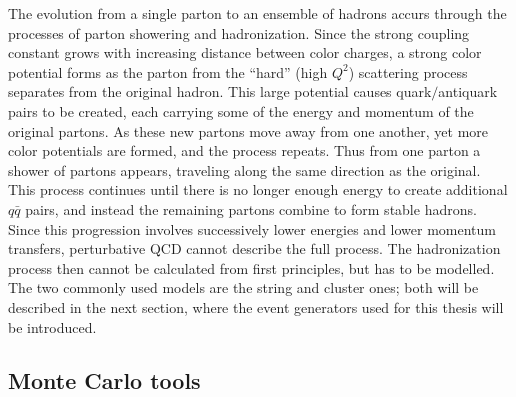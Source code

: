 The evolution from a single parton to an ensemble of hadrons accurs through the processes of parton showering and hadronization. Since the strong coupling constant grows with increasing distance between color charges, a strong color potential forms as the parton from the ``hard'' (high $Q^2$) scattering process separates from the original hadron. This large potential causes quark$/$antiquark pairs to be created, each carrying some of the energy and momentum of the original partons. As these new partons move away from one another, yet more color potentials are formed, and the process repeats. Thus from one parton a shower of partons appears, traveling along the same direction as the original.  This process continues until there is no longer enough energy to create additional $q\bar{q}$ pairs, and instead the remaining partons combine to form stable hadrons. Since this progression involves successively lower energies and lower momentum transfers, perturbative QCD cannot describe the full process.  The hadronization process then cannot be calculated from first principles, but has to be modelled. The two commonly used models are the string and cluster ones; both will be described in the next section, where the event generators used for this thesis will be introduced.


\subsection{Monte Carlo tools}


